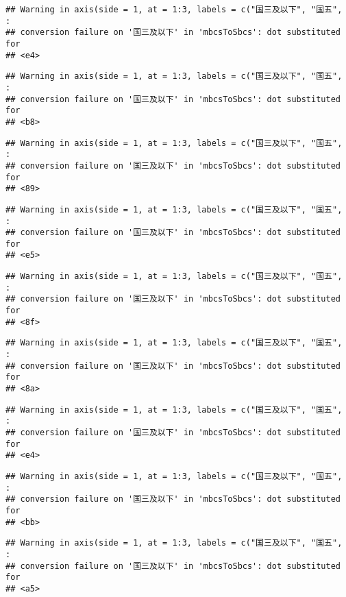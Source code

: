 \documentclass[]{article}
\begin{document}
\begin{verbatim}
## Warning in axis(side = 1, at = 1:3, labels = c("国三及以下", "国五", :
## conversion failure on '国三及以下' in 'mbcsToSbcs': dot substituted for
## <e4>
\end{verbatim}

\begin{verbatim}
## Warning in axis(side = 1, at = 1:3, labels = c("国三及以下", "国五", :
## conversion failure on '国三及以下' in 'mbcsToSbcs': dot substituted for
## <b8>
\end{verbatim}

\begin{verbatim}
## Warning in axis(side = 1, at = 1:3, labels = c("国三及以下", "国五", :
## conversion failure on '国三及以下' in 'mbcsToSbcs': dot substituted for
## <89>
\end{verbatim}

\begin{verbatim}
## Warning in axis(side = 1, at = 1:3, labels = c("国三及以下", "国五", :
## conversion failure on '国三及以下' in 'mbcsToSbcs': dot substituted for
## <e5>
\end{verbatim}

\begin{verbatim}
## Warning in axis(side = 1, at = 1:3, labels = c("国三及以下", "国五", :
## conversion failure on '国三及以下' in 'mbcsToSbcs': dot substituted for
## <8f>
\end{verbatim}

\begin{verbatim}
## Warning in axis(side = 1, at = 1:3, labels = c("国三及以下", "国五", :
## conversion failure on '国三及以下' in 'mbcsToSbcs': dot substituted for
## <8a>
\end{verbatim}

\begin{verbatim}
## Warning in axis(side = 1, at = 1:3, labels = c("国三及以下", "国五", :
## conversion failure on '国三及以下' in 'mbcsToSbcs': dot substituted for
## <e4>
\end{verbatim}

\begin{verbatim}
## Warning in axis(side = 1, at = 1:3, labels = c("国三及以下", "国五", :
## conversion failure on '国三及以下' in 'mbcsToSbcs': dot substituted for
## <bb>
\end{verbatim}

\begin{verbatim}
## Warning in axis(side = 1, at = 1:3, labels = c("国三及以下", "国五", :
## conversion failure on '国三及以下' in 'mbcsToSbcs': dot substituted for
## <a5>
\end{verbatim}
\end{document}
